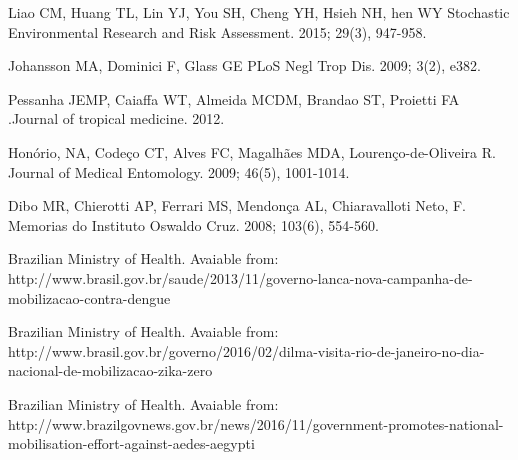 \documentclass[final,leqno]{siamltexmm2}
\begin{document}
\begin{thebibliography}{10}


Liao CM, Huang TL, Lin YJ, You SH, Cheng YH, Hsieh NH,  hen WY
\newblock Stochastic Environmental Research and Risk Assessment. 2015; 29(3), 947-958.


Johansson MA, Dominici F, Glass GE
\newblock  PLoS Negl Trop Dis. 2009; 3(2), e382.

Pessanha JEMP, Caiaffa WT, Almeida MCDM, Brandao ST, Proietti FA
\newblock.Journal of tropical medicine. 2012.


Honório, NA, Codeço CT, Alves FC, Magalhães MDA,  Lourenço-de-Oliveira R.
\newblock  Journal of Medical Entomology. 2009; 46(5), 1001-1014.

Dibo MR, Chierotti AP, Ferrari MS, Mendonça AL, Chiaravalloti Neto, F.
\newblock  Memorias do Instituto Oswaldo Cruz. 2008; 103(6), 554-560.






Brazilian Ministry of Health.
\newblock Avaiable from: http://www.brasil.gov.br/saude/2013/11/governo-lanca-nova-campanha-de-mobilizacao-contra-dengue 


Brazilian Ministry of Health.
\newblock Avaiable from: http://www.brasil.gov.br/governo/2016/02/dilma-visita-rio-de-janeiro-no-dia-nacional-de-mobilizacao-zika-zero



Brazilian Ministry of Health.
\newblock Avaiable from: http://www.brazilgovnews.gov.br/news/2016/11/government-promotes-national-mobilisation-effort-against-aedes-aegypti





\end{thebibliography}
\end{document}
